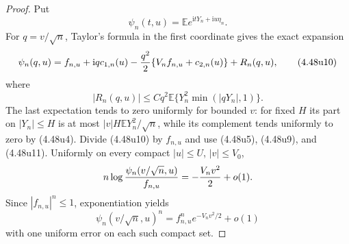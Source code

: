 \documentclass[11pt,a4paper]{article}
\numberwithin{equation}{section}
\theoremstyle{definition}
\theoremstyle{remark}
\newcommand{\E}{\mathbb E}
\newcommand{\ii}{\mathrm i}
\begin{document}
\begin{proof}
Put
\[
 \psi_n(t,u)=\E e^{\ii tY_n+\ii u\eta_n}.
\]
For $q=v/\sqrt n$, Taylor's formula in the first coordinate gives the
exact expansion
\[
 \psi_n(q,u)=f_{n,u}+\ii q c_{1,n}(u)
 -{q^2\over2}\{V_nf_{n,u}+c_{2,n}(u)\}+R_n(q,u),     \tag{4.48u10}
\]
where
\[
 |R_n(q,u)|\le Cq^2\E\{Y_n^2\min(|qY_n|,1)\}.        \tag{4.48u11}
\]
The last expectation tends to zero uniformly for bounded $v$: for fixed
$H$ its part on $|Y_n|\le H$ is at most
$|v|H\E Y_n^2/\sqrt n$, while its complement tends uniformly to zero by
(4.48u4).  Divide (4.48u10) by $f_{n,u}$ and use
(4.48u5), (4.48u9), and (4.48u11).  Uniformly on every compact
$|u|\le U$, $|v|\le V_0$,
\[
 n\log{\psi_n(v/\sqrt n,u)\over f_{n,u}}
 =-{V_nv^2\over2}+o(1).
\]
Since $|f_{n,u}|^n\le1$, exponentiation yields
\[
 \psi_n(v/\sqrt n,u)^n
 =f_{n,u}^n e^{-V_nv^2/2}+o(1)                       \tag{4.48u12}
\]
with one uniform error on each such compact set.


\end{proof}
\end{document}
